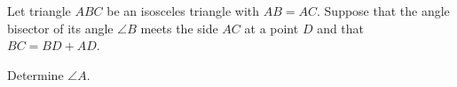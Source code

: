 Let triangle $ABC$ be an isosceles triangle with $AB = AC$. Suppose that the angle bisector of its angle $\angle B$ meets the side $AC$ at a point $D$ and that $BC = BD+AD$.

Determine $\angle A$.